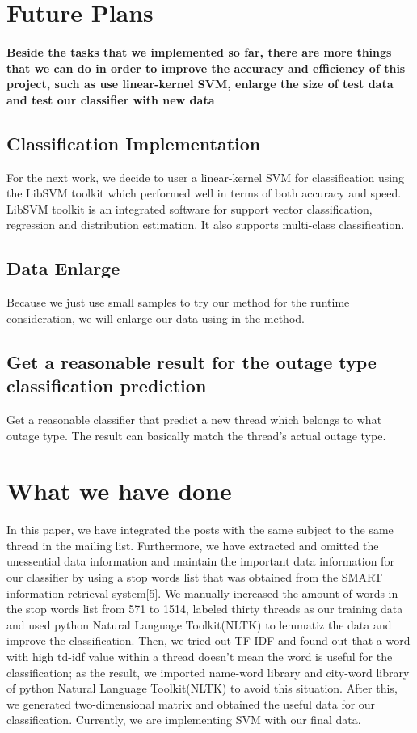 \documentclass{sig-alternate}
\begin{document}
\section{Future Plans}
\paragraph{Beside the tasks that we implemented so far, there are more things that we can do in order to improve the accuracy and efficiency of this project, such as use linear-kernel SVM, enlarge the size of test data and test our classifier with new data}

\subsection{Classification Implementation}
For the next work, we decide to user a linear-kernel SVM for classification using the LibSVM toolkit which performed well in terms of both accuracy and speed. LibSVM toolkit is an integrated software for support vector classification, regression and distribution estimation. It also supports multi-class classification.
\subsection{Data Enlarge}
Because we just use small samples to try our method for the runtime consideration, we will enlarge our data using in the method.
\subsection{Get a reasonable result for the outage type classification prediction}
Get a reasonable classifier that predict a new thread which belongs to what outage type. The result can basically match the thread’s actual  outage type.
\newline
\section{What we have done}
In this paper, we have integrated the posts with the same subject to the same thread in the mailing list. Furthermore, we have extracted and omitted the unessential data information and maintain the important data information for our classifier by using a stop words list that was obtained from the SMART information retrieval system[5]. We manually increased the amount of words in the stop words list from 571 to 1514, labeled thirty threads as our training data and used python Natural Language Toolkit(NLTK) to lemmatiz the data and improve the classification. Then, we tried out TF-IDF and found out that a word with high td-idf value within a thread doesn't mean the word is useful for the classification; as the result, we imported name-word library and city-word library of python Natural Language Toolkit(NLTK) to avoid this situation. After this, we generated two-dimensional matrix and obtained the useful data for our classification. Currently, we are implementing SVM with our final data.
\end{document}
